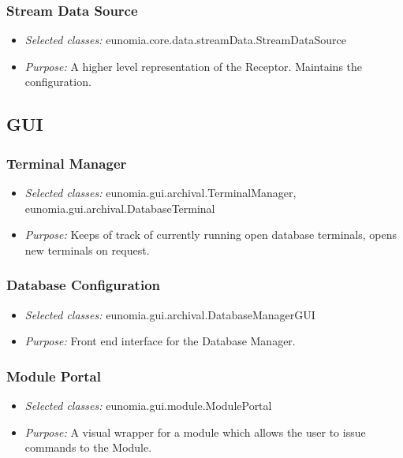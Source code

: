 \documentclass[titlepage,12pt]{article}
\begin{document}
\subsubsection{Stream Data Source}
\begin{itemize}
\item \emph{Selected classes:} eunomia.core.data.streamData.StreamDataSource
\item \emph{Purpose:} A higher level representation of the Receptor. Maintains the configuration.
\end{itemize}

\subsection{GUI}

\subsubsection{Terminal Manager}
\begin{itemize}
\item \emph{Selected classes:} eunomia.gui.archival.TerminalManager, eunomia.gui.archival.DatabaseTerminal
\item \emph{Purpose:} Keeps of track of currently running open database terminals, opens new terminals on request.
\end{itemize}

\subsubsection{Database Configuration}
\begin{itemize}
\item \emph{Selected classes:} eunomia.gui.archival.DatabaseManagerGUI
\item \emph{Purpose:} Front end interface for the Database Manager.
\end{itemize}

\subsubsection{Module Portal}
\begin{itemize}
\item \emph{Selected classes:} eunomia.gui.module.ModulePortal
\item \emph{Purpose:} A visual wrapper for a module which allows the user to issue commands to the Module.
\end{itemize}
\end{document}
